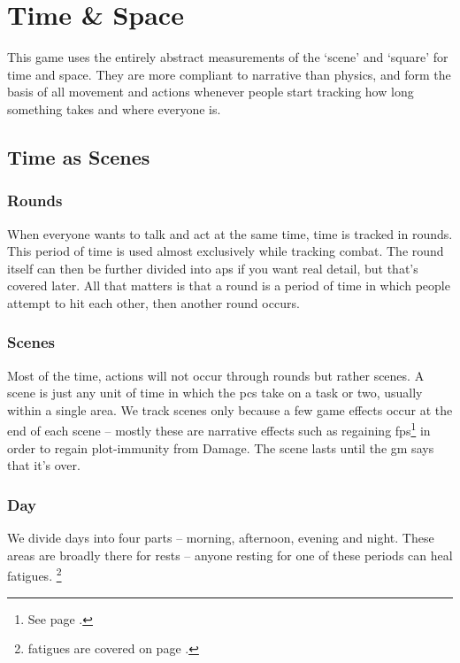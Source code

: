 \section{Time \& Space}

\begin{multicols}{2}

\noindent
This game uses the entirely abstract measurements of the `scene' and `square' for time and space. They are more compliant to narrative than physics, and form the basis of all movement and actions whenever people start tracking how long something takes and where everyone is.

\subsection{Time as Scenes}
\label{time}

\subsubsection{Rounds}

When everyone wants to talk and act at the same time, time is tracked in \glspl{round}.
This period of time is used almost exclusively while tracking combat.
The \gls{round} itself can then be further divided into \glspl{ap} if you want real detail, but that's covered later.
All that matters is that a \gls{round} is a period of time in which people attempt to hit each other, then another \gls{round} occurs.

\subsubsection{Scenes}

Most of the time, actions will not occur through \glspl{round} but rather scenes. A scene is just any unit of time in which the \glspl{pc} take on a task or two, usually within a single area. We track scenes only because a few game effects occur at the end of each scene -- mostly these are narrative effects such as regaining \glspl{fp}\footnote{See page \pageref{fate_points}.} in order to regain plot-immunity from Damage. The scene lasts until the \gls{gm} says that it's over.

\subsubsection{Day}
\label{daytimes}

We divide days into four parts -- morning, afternoon, evening and night.
These areas are broadly there for rests -- anyone resting for one of these periods can heal \glspl{fatigue}.%
\footnote{\Glspl{fatigue} are covered on page \pageref{fatigue}.}


\end{multicols}
